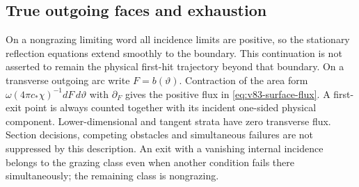 \subsection{True outgoing faces and exhaustion}
On a nongrazing limiting word all incidence limits are positive, so
the stationary reflection equations extend smoothly to the boundary.
This continuation is not asserted to remain the physical first-hit
trajectory beyond that boundary. On a transverse outgoing arc write
$F=b(\vartheta)$. Contraction of the area form
$\omega(4\pi c_*\chi)^{-1}dF\,d\vartheta$ with $\partial_F$
gives the positive flux in \eqref{eq:v83-surface-flux}. A first-exit
point is always counted together with its incident one-sided physical
component. Lower-dimensional and tangent strata have zero transverse
flux. Section decisions, competing obstacles and simultaneous failures
are not suppressed by this description. An exit with a vanishing
internal incidence belongs to the grazing class even when another
condition fails there simultaneously; the remaining class is nongrazing.

